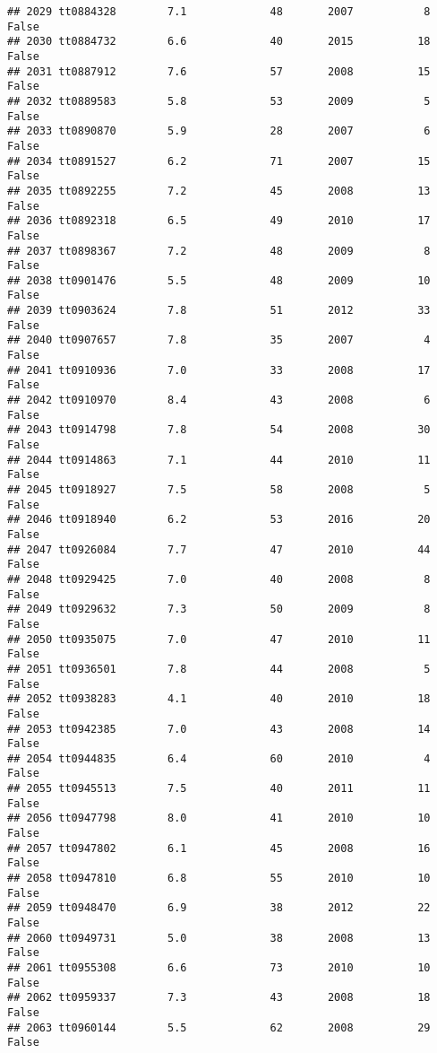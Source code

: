 \documentclass[
]{article}
\begin{document}
\begin{verbatim}
## 2029 tt0884328        7.1             48       2007           8   False
## 2030 tt0884732        6.6             40       2015          18   False
## 2031 tt0887912        7.6             57       2008          15   False
## 2032 tt0889583        5.8             53       2009           5   False
## 2033 tt0890870        5.9             28       2007           6   False
## 2034 tt0891527        6.2             71       2007          15   False
## 2035 tt0892255        7.2             45       2008          13   False
## 2036 tt0892318        6.5             49       2010          17   False
## 2037 tt0898367        7.2             48       2009           8   False
## 2038 tt0901476        5.5             48       2009          10   False
## 2039 tt0903624        7.8             51       2012          33   False
## 2040 tt0907657        7.8             35       2007           4   False
## 2041 tt0910936        7.0             33       2008          17   False
## 2042 tt0910970        8.4             43       2008           6   False
## 2043 tt0914798        7.8             54       2008          30   False
## 2044 tt0914863        7.1             44       2010          11   False
## 2045 tt0918927        7.5             58       2008           5   False
## 2046 tt0918940        6.2             53       2016          20   False
## 2047 tt0926084        7.7             47       2010          44   False
## 2048 tt0929425        7.0             40       2008           8   False
## 2049 tt0929632        7.3             50       2009           8   False
## 2050 tt0935075        7.0             47       2010          11   False
## 2051 tt0936501        7.8             44       2008           5   False
## 2052 tt0938283        4.1             40       2010          18   False
## 2053 tt0942385        7.0             43       2008          14   False
## 2054 tt0944835        6.4             60       2010           4   False
## 2055 tt0945513        7.5             40       2011          11   False
## 2056 tt0947798        8.0             41       2010          10   False
## 2057 tt0947802        6.1             45       2008          16   False
## 2058 tt0947810        6.8             55       2010          10   False
## 2059 tt0948470        6.9             38       2012          22   False
## 2060 tt0949731        5.0             38       2008          13   False
## 2061 tt0955308        6.6             73       2010          10   False
## 2062 tt0959337        7.3             43       2008          18   False
## 2063 tt0960144        5.5             62       2008          29   False

\end{verbatim}
\end{document}
